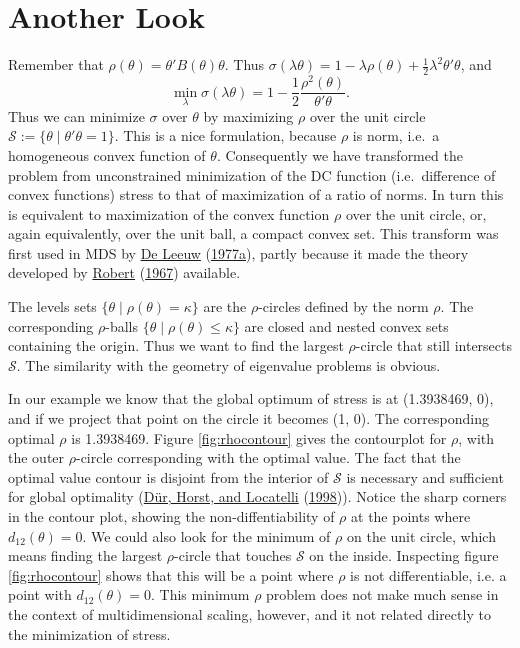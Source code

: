 \documentclass[
  12pt,
]{book}
\theoremstyle{definition}
\theoremstyle{definition}
\theoremstyle{definition}
\theoremstyle{definition}
\theoremstyle{remark}
\begin{document}
\hypertarget{picsphere}{%
\section{Another Look}\label{picsphere}}

Remember that \(\rho(\theta)=\theta'B(\theta)\theta\). Thus
\(\sigma(\lambda\theta)=1-\lambda\rho(\theta)+\frac12\lambda^2\theta'\theta\),
and \[
\min_\lambda\sigma(\lambda\theta)=1-\frac12\frac{\rho^2(\theta)}{\theta'\theta}.
\] Thus we can minimize \(\sigma\) over \(\theta\) by maximizing \(\rho\) over
the unit circle \(\mathcal{S}:=\{\theta\mid\theta'\theta=1\}\). This is a
nice formulation, because \(\rho\) is norm, i.e.~a homogeneous convex
function of \(\theta\). Consequently we have transformed the problem from
unconstrained minimization of the DC function (i.e.~difference of convex
functions) stress to that of maximization of a ratio of norms. In turn
this is equivalent to maximization of the convex function \(\rho\) over
the unit circle, or, again equivalently, over the unit ball, a compact
convex set. This transform was first used in MDS by \protect\hyperlink{ref-deleeuw_C_77}{De Leeuw} (\protect\hyperlink{ref-deleeuw_C_77}{1977a}),
partly because it made the theory developed by \protect\hyperlink{ref-robert_67}{Robert} (\protect\hyperlink{ref-robert_67}{1967}) available.

The levels sets \(\{\theta\mid\rho(\theta)=\kappa\}\) are the
\(\rho\)-circles defined by the norm \(\rho\). The corresponding
\(\rho\)-balls \(\{\theta\mid\rho(\theta)\leq\kappa\}\) are closed and
nested convex sets containing the origin. Thus we want to find the
largest \(\rho\)-circle that still intersects \(\mathcal{S}\). The
similarity with the geometry of eigenvalue problems is obvious.

In our example we know that the global optimum of stress is at
(1.3938469, 0), and if we project that point on the circle
it becomes (1, 0). The corresponding optimal \(\rho\) is
1.3938469. Figure \ref{fig:rhocontour} gives the contourplot for \(\rho\),
with the outer \(\rho\)-circle corresponding with the optimal value. The
fact that the optimal value contour is disjoint from the interior of
\(\mathcal{S}\) is necessary and sufficient for global optimality
(\protect\hyperlink{ref-dur_horst_locatelli_98}{Dür, Horst, and Locatelli} (\protect\hyperlink{ref-dur_horst_locatelli_98}{1998})). Notice the sharp corners in the contour plot,
showing the non-diffentiability of \(\rho\) at the points where
\(d_{12}(\theta)=0\). We could also look for the minimum of \(\rho\) on the
unit circle, which means finding the largest \(\rho\)-circle that touches
\(\mathcal{S}\) on the inside. Inspecting figure \ref{fig:rhocontour}
shows that this will be a point where \(\rho\) is not differentiable, i.e.
a point with \(d_{12}(\theta)=0\). This minimum \(\rho\) problem does not
make much sense in the context of multidimensional scaling, however, and
it not related directly to the minimization of stress.
\end{document}
